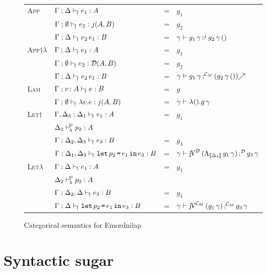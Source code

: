 \documentclass[runningheads,envcountsame]{llncs}
\newcommand{\monad}{M}
\begin{document}
\begin{figure}
{\begin{tabular}{l|l c l}
        \\ \hline
          \multirow{3}{*}{\textsc{App}}
        & $\typeruled{\Gamma}{\Delta}{e_1}{j}{A}$
        & = & $g_1$ \\ 
        & $\typeruled{\Gamma}{\emptyset}{e_2}{\C_\monad}{\homJ{A}{j}{B}}$ 
        & = & $g_2$ \\ \cline{2-2}
        & $\typeruled{\Gamma}{\Delta}{\eapp{e_2}{e_1}}{j}{B}$
        & = & $\gamma \vdash \comp[j]{\eapp{g_1}{\gamma}}{\eapp{\eapp{g_2}{\gamma}}{\eunit}}$
        \\ \hline
          \multirow{3}{*}{\textsc{App}$\dagger\lambda$}
        & $\typeruled{\Gamma}{\Delta}{e_1}{\C_\monad}{A}$
        & = & $g_1$ \\ 
        & $\typeruled{\Gamma}{\emptyset}{e_2}{\C_\monad}{\homJ{A}{\D}{B}}$ 
        & = & $g_2$ \\ \cline{2-2}
        & $\typeruled{\Gamma}{\Delta}{\eapp{e_2}{e_1}}{\C_\monad}{B}$
        & = & $\gamma \vdash \comp[\C_\monad]{\eapp{g_1}{\gamma}}{\f{(\eapp{\eapp{g_2}{\gamma}}{\eunit})}}$
        \\ \hline
          \multirow{2}{*}{\textsc{Lam}}
        & $\typeruled{\Gamma}{v\colon A}{e}{j}{B}$
        & = & $g$ \\ \cline{2-2}
        & $\typeruled{\Gamma}{\emptyset}{\elam{v}{e}}{\C_\monad}{\homJ{A}{j}{B}}$
        & = & $\gamma \vdash \elam{\eunit}{\eapp{g}{\gamma}}$
        \\ \hline
          \multirow{4}{*}{\textsc{Let}$\dagger$}
        & $\typeruled{\Gamma, \Delta_3}{\Delta_1}{e_1}{\D}{A}$ 
        & = & $g_1$ \\ 
        & $\typerulelp{\Delta_2}{p_2}{A}$ \\
        & $\typeruled{\Gamma}{\Delta_2, \Delta_3}{e_3}{\D}{B}$
        & = & $g_3$ \\ \cline{2-2}
        & $\typeruled{\Gamma}{\Delta_1, \Delta_3}{\elet{p_2}{e_1}{e_3}}{\D}{B}$
        & = & $\gamma \vdash \comp[\D]{\juncurry[\D]\,(\eapp{\eapp{\curry_{\sem{\Delta_3}}}{g_1}}{\gamma})}{\eapp{g_3}{\gamma}}$ 
        \\ \hline
          \multirow{4}{*}{\textsc{Let}$\lambda$}
        & $\typeruled{\Gamma}{\Delta}{e_1}{\C_\monad}{A}$ 
        & = & $g_1$ \\ 
        & $\typerulelp{\Delta_2}{p_2}{A}$ \\
        & $\typeruled{\Gamma}{\Delta_2, \Delta}{e_3}{\C_\monad}{B}$
        & = & $g_3$ \\ \cline{2-2}
        & $\typeruled{\Gamma}{\Delta}{\elet{p_2}{e_1}{e_3}}{\C_\monad}{B}$
        & = & $\gamma \vdash \comp[\C_\monad]{\juncurry[\C_\monad]\,(\eapp{g_1}{\gamma})}{\eapp{g_3}{\gamma}}$
        \\ \hline
    \end{tabular}}
    \caption{Categorical semantics for Emordnilap}
    \label{fig:semantics2}
\end{figure}
\fi
 
 

\section{Syntactic sugar}
\end{document}
